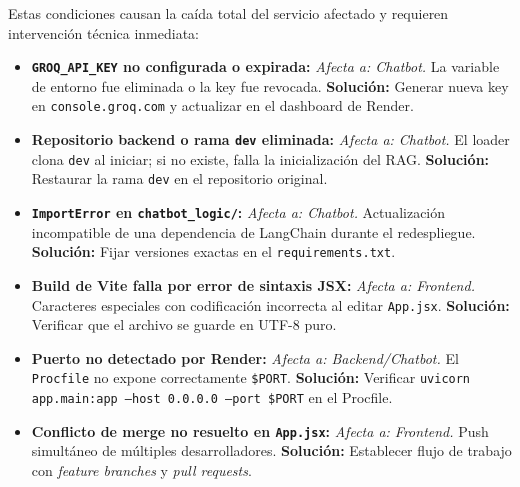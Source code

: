 \documentclass[12pt, letterpaper]{article}
\begin{document}
	\begin{tcolorbox}[colback=lightgray, colframe=warningred, title=\textbf{5.2 Errores Fatales (Fin abrupto del sistema)}]
		Estas condiciones causan la caída total del servicio afectado y requieren intervención técnica inmediata:
		\begin{itemize}
			\item \textbf{\texttt{GROQ\_API\_KEY} no configurada o expirada:} \textit{Afecta a: Chatbot.} La variable de entorno fue eliminada o la key fue revocada. \textbf{Solución:} Generar nueva key en \texttt{console.groq.com} y actualizar en el dashboard de Render.
			\item \textbf{Repositorio backend o rama \texttt{dev} eliminada:} \textit{Afecta a: Chatbot.} El loader clona \texttt{dev} al iniciar; si no existe, falla la inicialización del RAG. \textbf{Solución:} Restaurar la rama \texttt{dev} en el repositorio original.
			\item \textbf{\texttt{ImportError} en \texttt{chatbot\_logic/}:} \textit{Afecta a: Chatbot.} Actualización incompatible de una dependencia de LangChain durante el redespliegue. \textbf{Solución:} Fijar versiones exactas en el \texttt{requirements.txt}.
			\item \textbf{Build de Vite falla por error de sintaxis JSX:} \textit{Afecta a: Frontend.} Caracteres especiales con codificación incorrecta al editar \texttt{App.jsx}. \textbf{Solución:} Verificar que el archivo se guarde en UTF-8 puro.
			\item \textbf{Puerto no detectado por Render:} \textit{Afecta a: Backend/Chatbot.} El \texttt{Procfile} no expone correctamente \texttt{\$PORT}. \textbf{Solución:} Verificar \texttt{uvicorn app.main:app --host 0.0.0.0 --port \$PORT} en el Procfile.
			\item \textbf{Conflicto de merge no resuelto en \texttt{App.jsx}:} \textit{Afecta a: Frontend.} Push simultáneo de múltiples desarrolladores. \textbf{Solución:} Establecer flujo de trabajo con \textit{feature branches} y \textit{pull requests}.
		\end{itemize}
	\end{tcolorbox}
	
\end{document}
